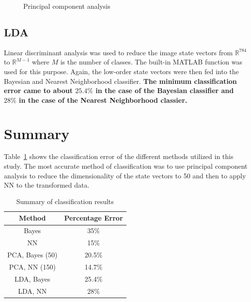 \documentclass[12pt]{article}
\begin{document}
\begin{figure}[h]
\begin{subfigure}[H]{0.49\textwidth}
  \end{subfigure}
  \caption{Principal component analysis}
  \label{fig:PCA}
\end{figure}
\subsection{LDA}
Linear discriminant analysis was used to reduce the image state vectors from $\mathbb{R}^{784}$ to $\mathbb{R}^{M-1}$ where $M$ is the number of classes. The built-in MATLAB function was used for this purpose. Again, the low-order state vectors were then fed into the Bayesian and Nearest Neighborhood classifier. \textbf{The minimum classification error came to about $ 25.4\%$ in the case of the Bayesian classifier and $28 \%$ in the case of the Nearest Neighborhood classier.}
\newpage
\section{Summary}
Table~\ref{table:1} shows the classification error of the different methods utilized in this study. The most accurate method of classification was to use principal component analysis to reduce the dimensionality of the state vectors to 50 and then to apply NN to the transformed data.
\begin{table}[H]
\centering
\caption{Summary of classification results}
\label{table:1}
\begin{tabular}{cc}
\hline
Method     & Percentage Error \\ \hline
Bayes      & 35\%             \\
NN         & 15\%             \\
PCA, Bayes (50) & 20.5\%           \\
PCA, NN  (150)  & 14.7\%           \\
LDA, Bayes & 25.4\%           \\
LDA, NN    & 28\%             \\ \hline
\end{tabular}
\end{table}


\end{document}

